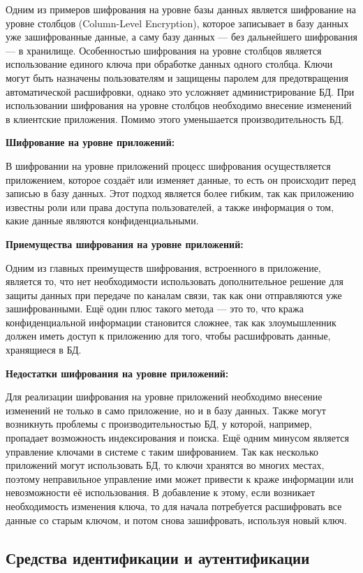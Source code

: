 Одним из примеров шифрования на уровне базы данных является шифрование на уровне столбцов (Column-Level Encryption), которое записывает в базу данных уже зашифрованные данные, а саму базу данных — без дальнейшего шифрования — в хранилище. Особенностью шифрования на уровне столбцов является использование единого ключа при обработке данных одного столбца. Ключи могут быть назначены пользователям и защищены паролем для предотвращения автоматической расшифровки, однако это усложняет администрирование БД. При использовании шифрования на уровне столбцов необходимо внесение изменений в клиентские приложения. Помимо этого уменьшается производительность БД.

\textbf{Шифрование на уровне приложений:}

В шифровании на уровне приложений процесс шифрования осуществляется приложением, которое создаёт или изменяет данные, то есть он происходит перед записью в базу данных. Этот подход является более гибким, так как приложению известны роли или права доступа пользователей, а также информация о том, какие данные являются конфиденциальными.

\textbf{Приемущества шифрования на уровне приложений:}

Одним из главных преимуществ шифрования, встроенного в приложение, является то, что нет необходимости использовать дополнительное решение для защиты данных при передаче по каналам связи, так как они отправляются уже зашифрованными. Ещё один плюс такого метода — это то, что кража конфиденциальной информации становится сложнее, так как злоумышленник должен иметь доступ к приложению для того, чтобы расшифровать данные, хранящиеся в БД.

\textbf{Недостатки шифрования на уровне приложений:}

Для реализации шифрования на уровне приложений необходимо внесение изменений не только в само приложение, но и в базу данных. Также могут возникнуть проблемы с производительностью БД, у которой, например, пропадает возможность индексирования и поиска. Ещё одним минусом является управление ключами в системе с таким шифрованием. Так как несколько приложений могут использовать БД, то ключи хранятся во многих местах, поэтому неправильное управление ими может привести к краже информации или невозможности её использования. В добавление к этому, если возникает необходимость изменения ключа, то для начала потребуется расшифровать все данные со старым ключом, и потом снова зашифровать, используя новый ключ.

\subsection{Средства идентификации и аутентификации}

